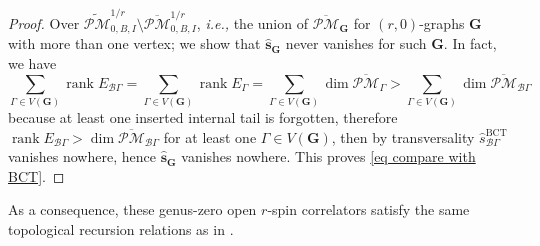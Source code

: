 \documentclass[11pt]{amsart}
\theoremstyle{definition}
\theoremstyle{remark}
\newcommand{\oPMb}{{\overline{\mathcal{PM}}}}
\newcommand{\<}{\left<}
\renewcommand{\>}{\right>}
\numberwithin{equation}{section}
\DeclareMathOperator{\rk}{rank}
\begin{document}
\begin{proof}
    Over $\widetilde{\mathcal{PM}}^{1/r}_{0,B,I}\setminus \oPMb^{1/r}_{0,B,I} $, \textit{i.e.,} the union of $\oPMb_{\bm{G}}$ for $(r,0)$-graphs $\bm{G}$ with more than one vertex; we show that $\hat{\bm{s}}_{\bm{G}}$ never vanishes for such $\bm{G}$. In fact, we %
have
    $$
   \sum_{\Gamma\in V(\bm{G})}\rk E_{\mathcal B\Gamma}= \sum_{\Gamma\in V(\bm{G})}\rk E_{\Gamma} =\sum_{\Gamma\in V(\bm{G})} \dim \oPMb_{\Gamma}>\sum_{\Gamma\in V(\bm{G})} \dim \oPMb_{\mathcal B\Gamma}
    $$
    because %
at least one inserted internal tail is forgotten, therefore $\rk E_{\mathcal B\Gamma}>\dim \oPMb_{\mathcal B\Gamma}$ for at least one $\Gamma \in V(\bm{G})$, then by transversality $\hat {s}^{\text{BCT}}_{\mathcal B \Gamma}$ vanishes nowhere, hence $\hat{\bm{s}}_{\bm{G}}$ vanishes nowhere. This proves \eqref{eq compare with BCT}.
        
        
    \end{proof}

    As a consequence, these genus-zero open $r$-spin correlators satisfy the same topological recursion relations as in \cite{BCT2}.
    
\end{document}

